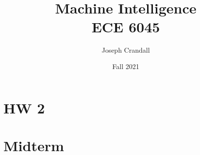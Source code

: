 
\usepackage{algorithm, algpseudocode, color, gensymb, siunitx, soul, subfiles}

\title{Machine Intelligence\\
\large ECE 6045}
\author{Joseph Crandall}
\date{Fall 2021}


\maketitle

%

\section{HW 2}


\section{Midterm}


%

%

%

%

%


